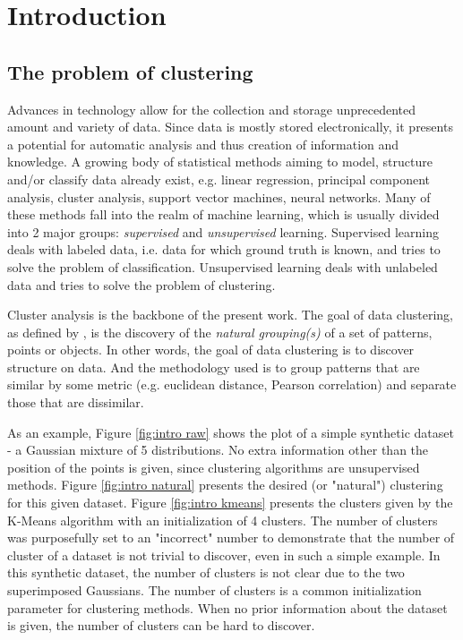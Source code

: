 \chapter{Introduction}
\label{chapter:introduction}


\section{The problem of clustering}
\label{sec:clustering}

Advances in technology allow for the collection and storage unprecedented amount and variety of data.
Since data is mostly stored electronically, it presents a potential for automatic analysis and thus creation of information and knowledge.
A growing body of statistical methods aiming to model, structure and/or classify data already exist, e.g. linear regression, principal component analysis, cluster analysis, support vector machines, neural networks.
Many of these methods fall into the realm of machine learning, which is usually divided into 2 major groups: \textit{supervised} and \textit{unsupervised} learning.
Supervised learning deals with labeled data, i.e. data for which ground truth is known, and tries to solve the problem of classification. %
Unsupervised learning deals with unlabeled data and tries to solve the problem of clustering. %

Cluster analysis is the backbone of the present work.
The goal of data clustering, as defined by \cite{Jain2010}, is the discovery of the \textit{natural grouping(s)} of a set of patterns, points or objects.
In other words, the goal of data clustering is to discover structure on data.
And the methodology used is to group patterns that are similar by some metric (e.g. euclidean distance, Pearson correlation) and separate those that are dissimilar. %

As an example, Figure \ref{fig:intro raw} shows the plot of a simple synthetic dataset - a Gaussian mixture of 5 distributions.
No extra information other than the position of the points is given, since clustering algorithms are unsupervised methods.
Figure \ref{fig:intro natural} presents the desired (or "natural") clustering for this given dataset.
Figure \ref{fig:intro kmeans} presents the clusters given by the K-Means algorithm with an initialization of 4 clusters.
The number of clusters was purposefully set to an "incorrect" number to demonstrate that the number of cluster of a dataset is not trivial to discover, even in such a simple example.
In this synthetic dataset, the number of clusters is not clear due to the two superimposed Gaussians.
The number of clusters is a common initialization parameter for clustering methods.
When no prior information about the dataset is given, the number of clusters can be hard to discover.

